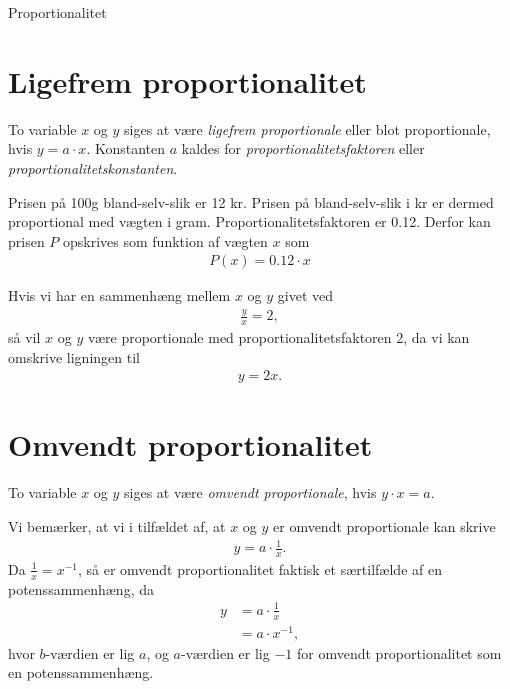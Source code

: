 \begin{center}
	\Huge
	Proportionalitet
\end{center}
\section*{Ligefrem proportionalitet}

\begin{defn}
	To variable $x$ og $y$ siges at være \textit{ligefrem proportionale} eller blot proportionale, hvis $y = a\cdot x$. Konstanten $a$ kaldes for \textit{proportionalitetsfaktoren} eller
	\textit{proportionalitetskonstanten}.
\end{defn}

\begin{exa}
	\label{exa:slik}
	Prisen på 100g bland-selv-slik er 12 kr. Prisen på bland-selv-slik i kr er dermed proportional med vægten i gram. Proportionalitetsfaktoren er 0.12. Derfor kan prisen $P$ opskrives som funktion af 		vægten $x$ som
 	\begin{align*}
 		P(x) = 0.12 \cdot x
 	\end{align*}
\end{exa}

\begin{exa}
	Hvis vi har en sammenhæng mellem $x$ og $y$ givet ved
	\begin{align*}
		\frac{y}{x} = 2,
	\end{align*}
	så vil $x$ og $y$ være proportionale med proportionalitetsfaktoren $2$, da vi kan omskrive ligningen til
	\begin{align*}
		y = 2x.
	\end{align*}
\end{exa}

\section*{Omvendt proportionalitet}

\begin{defn}
	To variable $x$ og $y$ siges at være \textit{omvendt proportionale}, hvis $y\cdot x = a$. 
\end{defn}
Vi bemærker, at vi i tilfældet af, at $x$ og $y$ er omvendt proportionale kan skrive
\begin{align*}
	y = a \cdot \frac{1}{x}.
\end{align*}
Da $\frac{1}{x} = x^{-1}$, så er omvendt proportionalitet faktisk et særtilfælde af en potenssammenhæng, da
\begin{align*}
	y &= a \cdot \frac{1}{x} \\
	&= a \cdot x^{-1},
\end{align*}
hvor $b$-værdien er lig $a$, og $a$-værdien er lig $-1$ for omvendt proportionalitet som en potenssammenhæng. 

